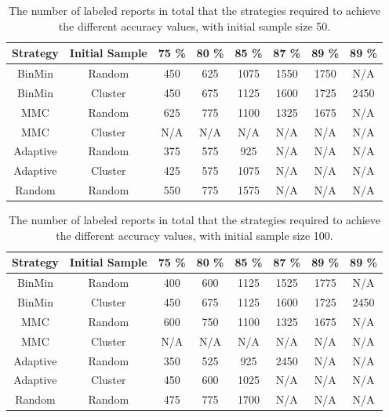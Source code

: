 \begin{table}
    \centering
    \begin{tabular}{|cccccccc|}
        \hline
        \textbf{Strategy} & \textbf{Initial Sample} & \textbf{75 \%} & \textbf{80 \%} & \textbf{85 \%} & \textbf{87 \%} & \textbf{89 \%} & \textbf{89 \%}\\
        \hline
        BinMin & Random & 450 & 625 & 1075 & 1550 & 1750 & N/A\\
        BinMin & Cluster & 450 & 675 & 1125 & 1600 & 1725 & 2450\\
        MMC & Random & 625 & 775 & 1100 & 1325 & 1675 & N/A\\
        MMC & Cluster & N/A & N/A & N/A & N/A & N/A & N/A\\
        Adaptive & Random & 375 & 575 & 925 & N/A & N/A & N/A\\
        Adaptive & Cluster & 425 & 575 & 1075 & N/A & N/A & N/A\\
        Random & Random & 550 & 775 & 1575 & N/A & N/A & N/A\\
        \hline
    \end{tabular}
    \caption{The number of labeled reports in total that the strategies required to achieve the different accuracy values, with initial sample size 50.}
    \label{tab:active-learning-accuracy-50}
\end{table}

\begin{table}
    \centering
    \begin{tabular}{|cccccccc|}
        \hline
        \textbf{Strategy} & \textbf{Initial Sample} & \textbf{75 \%} & \textbf{80 \%} & \textbf{85 \%} & \textbf{87 \%} & \textbf{89 \%} & \textbf{89 \%}\\
        \hline
        BinMin & Random & 400 & 600 & 1125 & 1525 & 1775 & N/A\\
        BinMin & Cluster & 450 & 675 & 1125 & 1600 & 1725 & 2450\\
        MMC & Random & 600 & 750 & 1100 & 1325 & 1675 & N/A\\
        MMC & Cluster & N/A & N/A & N/A & N/A & N/A & N/A\\
        Adaptive & Random & 350 & 525 & 925 & 2450 & N/A & N/A\\
        Adaptive & Cluster & 450 & 600 & 1025 & N/A & N/A & N/A\\
        Random & Random & 475 & 775 & 1700 & N/A & N/A & N/A\\
        \hline
    \end{tabular}
    \caption{The number of labeled reports in total that the strategies required to achieve the different accuracy values, with initial sample size 100.}
    \label{tab:active-learning-accuracy-100}
\end{table}

